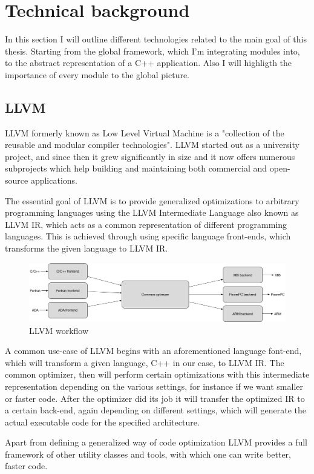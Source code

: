 \section{Technical background}
\par In this section I will outline different technologies related to the main goal of this thesis. Starting from the global framework, which I'm integrating modules into, to the abstract representation of a C++ application. Also I will highligth the importance of every module to the global picture.

\subsection{LLVM}
\par LLVM formerly known as Low Level Virtual Machine is a "collection of the reusable and modular compiler technologies"\cite{llvm_mainpage}. LLVM started out as a university project\cite{LLVM:CGO04}, and since then it grew significantly in size and it now offers numerous subprojects which help building and maintaining both commercial and open-source applications. \medskip
\par The essential goal of LLVM is to provide generalized optimizations to arbitrary programming languages using the LLVM Intermediate Language also known as LLVM IR, which acts as a common representation of different programming languages. This is achieved through using specific language front-ends, which transforms the given language to LLVM IR. 
\begin{figure}[h]
	\caption{LLVM workflow}
	\includegraphics[scale=0.33]{images/llvm_flow}
\end{figure}
\par A common use-case of LLVM begins with an aforementioned language font-end, which will transform a given language, C++ in our case, to LLVM IR. The common optimizer, then will perform certain optimizations with this intermediate representation depending on the various settings, for instance if we want smaller or faster code. After the optimizer did its job it will transfer the optimized IR to a certain back-end, again depending on different settings, which will generate the actual executable code for the specified architecture. \medskip
\par Apart from defining a generalized way of code optimization LLVM provides a full framework of other utility classes and tools, with which one can write better, faster code.

